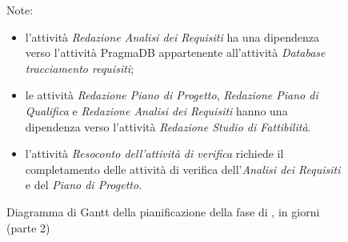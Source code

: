 \pagebreak
\begin{figure}[H]
\label{tab:genweeks2}
\caption{Diagramma di Gantt della pianificazione della fase di \AR, in giorni (parte 2)}

Note:
\begin{itemize}
	\item l'attività \emph{Redazione Analisi dei Requisiti} ha una dipendenza verso l'attività PragmaDB appartenente all'attività \emph{Database tracciamento requisiti};
	\item le attività \emph{Redazione Piano di Progetto}, \emph{Redazione Piano di Qualifica} e \emph{Redazione Analisi dei Requisiti} hanno una dipendenza verso l'attività \emph{Redazione Studio di Fattibilità}.
	\item l'attività \emph{Resoconto dell'attività di verifica} richiede il completamento delle attività di verifica dell'\emph{Analisi dei Requisiti} e del \emph{Piano di Progetto}.
\end{itemize} 
\end{figure}
		
